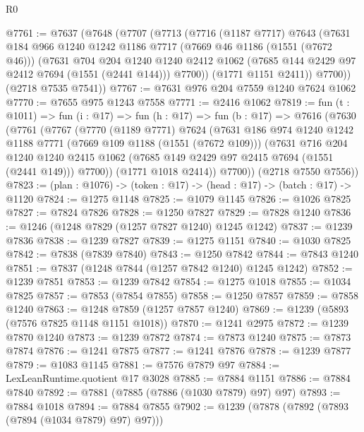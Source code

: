 \begin{lexlean}{R0}
\begin{coremodule}
@7761 := @7637
    (@7648
      (@7707
        (@7713
          (@7716
            (@1187 @7717)
            @7643
            (@7631
              @184
              @966
              @1240
              @1242
              @1186
              @7717
              (@7669 @46 @1186 (@1551 (@7672 @46)))
              (@7631
                @704
                @204
                @1240
                @1240
                @2412
                @1062
                (@7685 @144 @2429 @97 @2412 @7694 (@1551 (@2441 @144)))
                @7700))
            (@1771 @1151 @2411))
          @7700))
      (@2718 @7535 @7541))
@7767 := @7631 @976 @204 @7559 @1240 @7624 @1062
@7770 := @7655 @975 @1243 @7558
@7771 := @2416 @1062
@7819 := fun (t : @1011) =>
  fun (i : @17) =>
  fun (h : @17) =>
  fun (b : @17) =>
  @7616
    (@7630
      (@7761
        (@7767
          (@7770
            (@1189 @7771)
            @7624
            (@7631
              @186
              @974
              @1240
              @1242
              @1188
              @7771
              (@7669 @109 @1188 (@1551 (@7672 @109)))
              (@7631
                @716
                @204
                @1240
                @1240
                @2415
                @1062
                (@7685 @149 @2429 @97 @2415 @7694 (@1551 (@2441 @149)))
                @7700))
            (@1771 @1018 @2414))
          @7700))
      (@2718 @7550 @7556))
@7823 := (plan : @1076) -> (token : @17) -> (head : @17) -> (batch : @17) -> @1120
@7824 := @1275 @1148
@7825 := @1079 @1145
@7826 := @1026 @7825
@7827 := @7824 @7826
@7828 := @1250 @7827
@7829 := @7828 @1240
@7836 := @1246 (@1248 @7829 (@1257 @7827 @1240) @1245 @1242)
@7837 := @1239 @7836
@7838 := @1239 @7827
@7839 := @1275 @1151
@7840 := @1030 @7825
@7842 := @7838 (@7839 @7840)
@7843 := @1250 @7842
@7844 := @7843 @1240
@7851 := @7837 (@1248 @7844 (@1257 @7842 @1240) @1245 @1242)
@7852 := @1239 @7851
@7853 := @1239 @7842
@7854 := @1275 @1018
@7855 := @1034 @7825
@7857 := @7853 (@7854 @7855)
@7858 := @1250 @7857
@7859 := @7858 @1240
@7863 := @1248 @7859 (@1257 @7857 @1240)
@7869 := @1239 (@5893 (@7576 @7825 @1148 @1151 @1018))
@7870 := @1241 @2975
@7872 := @1239 @7870 @1240
@7873 := @1239 @7872
@7874 := @7873 @1240
@7875 := @7873 @7874
@7876 := @1241 @7875
@7877 := @1241 @7876
@7878 := @1239 @7877
@7879 := @1083 @1145
@7881 := @7576 @7879 @97
@7884 := LexLeanRuntime.quotient @17 @3028
@7885 := @7884 @1151
@7886 := @7884 @7840
@7892 := @7881 (@7885 (@7886 (@1030 @7879) @97) @97)
@7893 := @7884 @1018
@7894 := @7884 @7855
@7902 := @1239 (@7878 (@7892 (@7893 (@7894 (@1034 @7879) @97) @97)))

\end{coremodule}
\end{lexlean}
